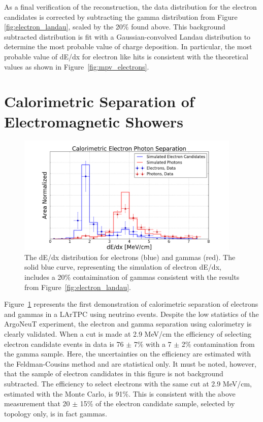 As a final verification of the reconstruction, the data distribution for the electron candidates is corrected by subtracting the gamma distribution from Figure \ref{fig:electron_landau}, scaled by the 20\% found above.  This background subtracted distribution is fit with a Gaussian-convolved Landau distribution to determine the most probable value of charge deposition.  In particular, the most probable value of dE/dx for electron like hits is consistent with the theoretical values as shown in Figure~\ref{fig:mpv_electrons}.




\FloatBarrier








\section{\label{sec:argo_dedx} Calorimetric Separation of Electromagnetic Showers}

\begin{figure}[p]
  \centering
  \includegraphics[width=0.95\textwidth]{emshower_figures/median_dedx.png}
  \caption{The dE/dx distribution for electrons (blue) and gammas (red).  The solid blue curve, representing the simulation of electron dE/dx, includes a 20\% contaimination of gammas consistent with the results from Figure~\ref{fig:electron_landau}.}
  \label{fig:dEdx}
\end{figure}


Figure~\ref{fig:dEdx} represents the first demonstration of calorimetric separation of electrons and gammas in a LArTPC using neutrino events.  Despite the low statistics of the ArgoNeuT experiment, the electron and gamma separation using calorimetry is clearly validated. When a cut is made at 2.9 MeV/cm the efficiency of selecting electron candidate events in data is 76 $\pm$ 7\% with a 7 $\pm$ 2\% contamination from the gamma sample. Here, the uncertainties on the efficiency are estimated with the Feldman-Cousins method \cite{FeldmanCousins} and are statistical only.  It must be noted, however, that the sample of electron candidates in this figure is not background subtracted.  The efficiency to select electrons with the same cut at 2.9 MeV/cm, estimated with the Monte Carlo, is 91\%.  This is consistent with the above measurement that 20 $\pm$ 15\% of the electron candidate sample, selected by topology only, is in fact gammas.


